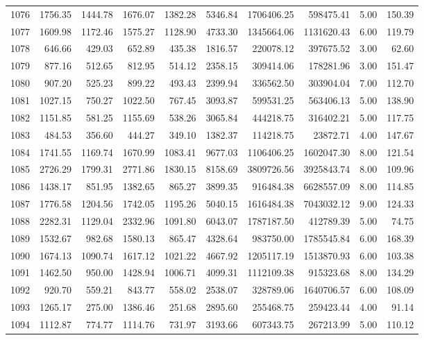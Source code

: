 \begin{tabular}{lrrrrrrrrr}
1076 & 1756.35 & 1444.78 & 1676.07 & 1382.28 & 5346.84 & 1706406.25 & 598475.41 & 5.00 & 150.39 \\
1077 & 1609.98 & 1172.46 & 1575.27 & 1128.90 & 4733.30 & 1345664.06 & 1131620.43 & 6.00 & 119.79 \\
1078 & 646.66 & 429.03 & 652.89 & 435.38 & 1816.57 & 220078.12 & 397675.52 & 3.00 & 62.60 \\
1079 & 877.16 & 512.65 & 812.95 & 514.12 & 2358.15 & 309414.06 & 178281.96 & 3.00 & 151.47 \\
1080 & 907.20 & 525.23 & 899.22 & 493.43 & 2399.94 & 336562.50 & 303904.04 & 7.00 & 112.70 \\
1081 & 1027.15 & 750.27 & 1022.50 & 767.45 & 3093.87 & 599531.25 & 563406.13 & 5.00 & 138.90 \\
1082 & 1151.85 & 581.25 & 1155.69 & 538.26 & 3065.84 & 444218.75 & 316402.21 & 5.00 & 117.75 \\
1083 & 484.53 & 356.60 & 444.27 & 349.10 & 1382.37 & 114218.75 & 23872.71 & 4.00 & 147.67 \\
1084 & 1741.55 & 1169.74 & 1670.99 & 1083.41 & 9677.03 & 1106406.25 & 1602047.30 & 8.00 & 121.54 \\
1085 & 2726.29 & 1799.31 & 2771.86 & 1830.15 & 8158.69 & 3809726.56 & 3925843.74 & 8.00 & 109.96 \\
1086 & 1438.17 & 851.95 & 1382.65 & 865.27 & 3899.35 & 916484.38 & 6628557.09 & 8.00 & 114.85 \\
1087 & 1776.58 & 1204.56 & 1742.05 & 1195.26 & 5040.15 & 1616484.38 & 7043032.12 & 9.00 & 124.33 \\
1088 & 2282.31 & 1129.04 & 2332.96 & 1091.80 & 6043.07 & 1787187.50 & 412789.39 & 5.00 & 74.75 \\
1089 & 1532.67 & 982.68 & 1580.13 & 865.47 & 4328.64 & 983750.00 & 1785545.84 & 6.00 & 168.39 \\
1090 & 1674.13 & 1090.74 & 1617.12 & 1021.22 & 4667.92 & 1205117.19 & 1513870.93 & 6.00 & 103.38 \\
1091 & 1462.50 & 950.00 & 1428.94 & 1006.71 & 4099.31 & 1112109.38 & 915323.68 & 8.00 & 134.29 \\
1092 & 920.70 & 559.21 & 843.77 & 558.02 & 2538.07 & 328789.06 & 1640706.57 & 6.00 & 108.09 \\
1093 & 1265.17 & 275.00 & 1386.46 & 251.68 & 2895.60 & 255468.75 & 259423.44 & 4.00 & 91.14 \\
1094 & 1112.87 & 774.77 & 1114.76 & 731.97 & 3193.66 & 607343.75 & 267213.99 & 5.00 & 110.12 \\

\end{tabular}
